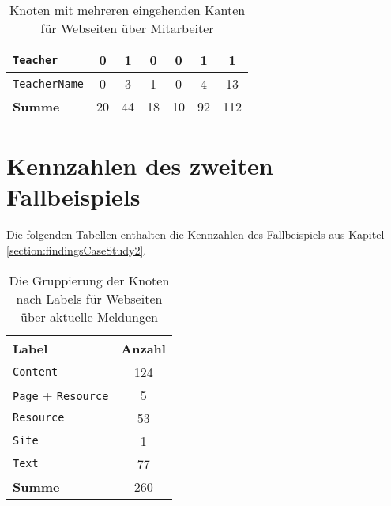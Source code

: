 \begin{table}[!h]
\begin{tabular}{|l|c|c|c|c|c|c|}
                \texttt{Teacher}                               & 0             & 1              & 0               & 0             & 1              & 1             \\ \hline
                \texttt{TeacherName}                           & 0             & 3              & 1               & 0             & 4              & 13            \\ \hline
                \hline
                \textbf{Summe}                        & 20            & 44             & 18              & 10            & 92             & 112           \\ \hline
            \end{tabular}
            \caption{Knoten mit mehreren eingehenden Kanten für Webseiten über Mitarbeiter}
            \label{table:findingsTeachersFiguresSharedNodes}
        \end{table}

    \section{Kennzahlen des zweiten Fallbeispiels}
        \label{section:appendixExample2Figures}
        Die folgenden Tabellen enthalten die Kennzahlen des
        Fallbeispiels aus Kapitel \ref{section:findingsCaseStudy2}.

        \begin{table}[!h]
            \centering
            \begin{tabular}{|l|c|}
                \hline
                \textbf{Label}  & \multicolumn{1}{l|}{\textbf{Anzahl}} \\ \hline
                \texttt{Content}         & 124                                  \\ \hline
                \texttt{Page} + \texttt{Resource} & 5                                    \\ \hline
                \texttt{Resource}        & 53                                   \\ \hline
                \texttt{Site}            & 1                                    \\ \hline
                \texttt{Text}            & 77                                   \\ \hline
                \hline
                \textbf{Summe}  & 260                                  \\ \hline
            \end{tabular}
            \caption{Die Gruppierung der Knoten nach Labels für Webseiten über aktuelle Meldungen}
            \label{table:findingsNewsFiguresNodesByLabel}
        \end{table}

